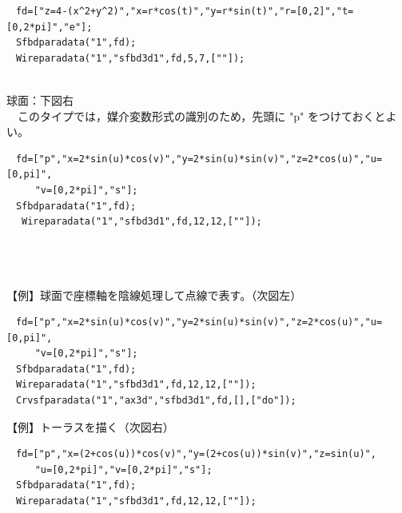 \documentclass[papersize,a4paper,12pt,uplatex]{jsarticle}
\begin{document}
\begin{description}
\begin{verbatim}
　fd=["z=4-(x^2+y^2)","x=r*cos(t)","y=r*sin(t)","r=[0,2]","t=[0,2*pi]","e"];
　Sfbdparadata("1",fd);
　Wireparadata("1","sfbd3d1",fd,5,7,[""]);
\end{verbatim}
　\\
球面：下図右\\
　このタイプでは，媒介変数形式の識別のため，先頭に "p" をつけておくとよい。
\begin{verbatim}
　fd=["p","x=2*sin(u)*cos(v)","y=2*sin(u)*sin(v)","z=2*cos(u)","u=[0,pi]",
　　　"v=[0,2*pi]","s"];
　Sfbdparadata("1",fd);
　 Wireparadata("1","sfbd3d1",fd,12,12,[""]); 
\end{verbatim}
　\\
　　\\
　\\
【例】球面で座標軸を陰線処理して点線で表す。（次図左）
\begin{verbatim}
　fd=["p","x=2*sin(u)*cos(v)","y=2*sin(u)*sin(v)","z=2*cos(u)","u=[0,pi]",
　　　"v=[0,2*pi]","s"];
　Sfbdparadata("1",fd);
　Wireparadata("1","sfbd3d1",fd,12,12,[""]); 
　Crvsfparadata("1","ax3d","sfbd3d1",fd,[],["do"]);
\end{verbatim}
【例】トーラスを描く（次図右）
\begin{verbatim}
　fd=["p","x=(2+cos(u))*cos(v)","y=(2+cos(u))*sin(v)","z=sin(u)",
　　　"u=[0,2*pi]","v=[0,2*pi]","s"];
　Sfbdparadata("1",fd);
　Wireparadata("1","sfbd3d1",fd,12,12,[""]); 
\end{verbatim}
　\\
　　　　\\


\end{description}
\end{document}
